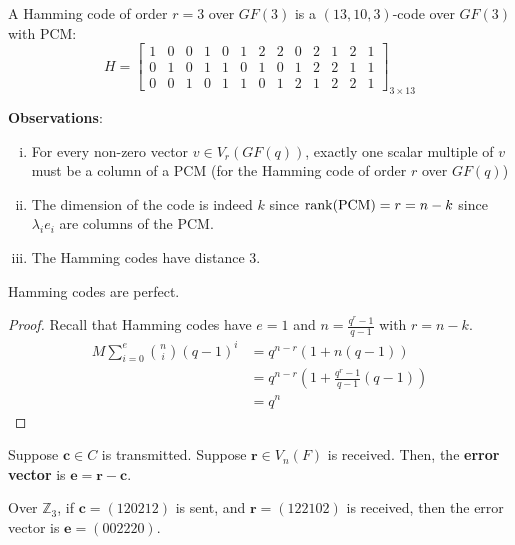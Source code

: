 \begin{exbox}
    \begin{example}
        A Hamming code of order $ r=3 $ over $ GF(3) $ is a $ (13,10,3) $-code over $ GF(3) $ with
        PCM:
        \[ H=
            \left[\begin{array}{ccc|ccc|ccc|ccc|c}
                    1 & 0 & 0 & 1 & 0 & 1 & 2 & 2 & 0 & 2 & 1 & 2 & 1 \\
                    0 & 1 & 0 & 1 & 1 & 0 & 1 & 0 & 1 & 2 & 2 & 1 & 1 \\
                    0 & 0 & 1 & 0 & 1 & 1 & 0 & 1 & 2 & 1 & 2 & 2 & 1
                \end{array}\right]_{3\times 13} \]
    \end{example}
\end{exbox}

\textbf{Observations}:
\begin{enumerate}[(i)]
    \item For every non-zero vector $ v\in V_r(GF(q)) $, exactly one scalar multiple of $ v $
          must be a column of a PCM (for the Hamming code of order $ r $ over $ GF(q) $)
    \item The dimension of the code is indeed $ k $ since $ \operatorname{rank}(\text{PCM})=r=n-k $
          since $ \lambda_i e_i $ are columns of the PCM.
    \item The Hamming codes have distance 3.
\end{enumerate}

\begin{thmbox}
    \begin{theorem}
        Hamming codes are perfect.
    \end{theorem}
\end{thmbox}
\begin{proof}
    Recall that Hamming codes have $ e=1 $ and $ n=\frac{q^r-1}{q-1} $ with $ r=n-k $.
    \begin{align*}
        M \sum\limits_{i=0}^{e} \binom{n}{i}(q-1)^i
         & =q^{n-r}(1+n(q-1))                               \\
         & =q^{n-r}\left( 1+\frac{q^r-1}{q-1} (q-1) \right) \\
         & =q^n
    \end{align*}
\end{proof}

\begin{defbox}
    \begin{definition}
        Suppose $ \bm{c}\in C $ is transmitted. Suppose $ \bm{r}\in V_n(F) $ is received.
        Then, the \textbf{error vector} is $ \bm{e}=\bm{r}-\bm{c} $.
    \end{definition}
\end{defbox}

\begin{exbox}
    \begin{example}
        Over $ \mathbb{Z}_3 $, if $ \bm{c}=(120212) $ is sent, and $ \bm{r}=(122102) $ is received, then
        the error vector is $ \bm{e}=(002220) $.
    \end{example}
\end{exbox}
